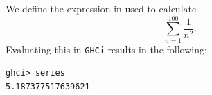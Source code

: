 We define the expression in  used to calculate
\[
    \sum_{n=1}^{100} \frac{1}{n^2}.
\]
Evaluating this in \verb|GHCi| results in the following:
\begin{lstlisting}
ghci> series
5.187377517639621
\end{lstlisting}
